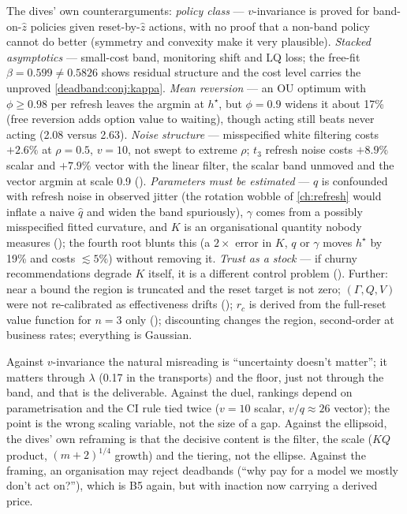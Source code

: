 The dives' own counterarguments: \emph{policy class} --- $v$-invariance is proved for band-on-$\hat z$ policies given reset-by-$\hat z$ actions, with no proof that a non-band policy cannot do better (symmetry and convexity make it very plausible). \emph{Stacked asymptotics} --- small-cost band, monitoring shift and LQ loss; the free-fit $\beta = 0.599 \ne 0.5826$ shows residual structure and the cost level carries the unproved \cref{deadband:conj:kappa}. \emph{Mean reversion} --- an OU optimum with $\phi \ge 0.98$ per refresh leaves the argmin at $h^\star$, but $\phi = 0.9$ widens it about 17\% (free reversion adds option value to waiting), though acting still beats never acting (2.08 versus 2.63). \emph{Noise structure} --- misspecified white filtering costs $+2.6\%$ at $\rho = 0.5$, $v = 10$, not swept to extreme $\rho$; $t_3$ refresh noise costs $+8.9\%$ scalar and $+7.9\%$ vector with the linear filter, the scalar band unmoved and the vector argmin at scale 0.9 (). \emph{Parameters must be estimated} --- $q$ is confounded with refresh noise in observed jitter (the rotation wobble of \cref{ch:refresh} would inflate a naive $\hat q$ and widen the band spuriously), $\gamma$ comes from a possibly misspecified fitted curvature, and $K$ is an organisational quantity nobody measures (); the fourth root blunts this (a $2\times$ error in $K$, $q$ or $\gamma$ moves $h^\star$ by 19\% and costs $\lesssim 5\%$) without removing it. \emph{Trust as a stock} --- if churny recommendations degrade $K$ itself, it is a different control problem (). Further: near a bound the region is truncated and the reset target is not zero; $(\Gamma, Q, V)$ were not re-calibrated as effectiveness drifts (); $r_c$ is derived from the full-reset value function for $n = 3$ only (); discounting changes the region, second-order at business rates; everything is Gaussian.

Against $v$-invariance the natural misreading is ``uncertainty doesn't matter''; it matters through $\lambda$ (0.17 in the transports) and the floor, just not through the band, and that is the deliverable. Against the duel, rankings depend on parametrisation and the CI rule tied twice ($v = 10$ scalar, $v/q \approx 26$ vector); the point is the wrong scaling variable, not the size of a gap. Against the ellipsoid, the dives' own reframing is that the decisive content is the filter, the scale ($KQ$ product, $(m+2)^{1/4}$ growth) and the tiering, not the ellipse. Against the framing, an organisation may reject deadbands (``why pay for a model we mostly don't act on?''), which is B5 again, but with inaction now carrying a derived price.

